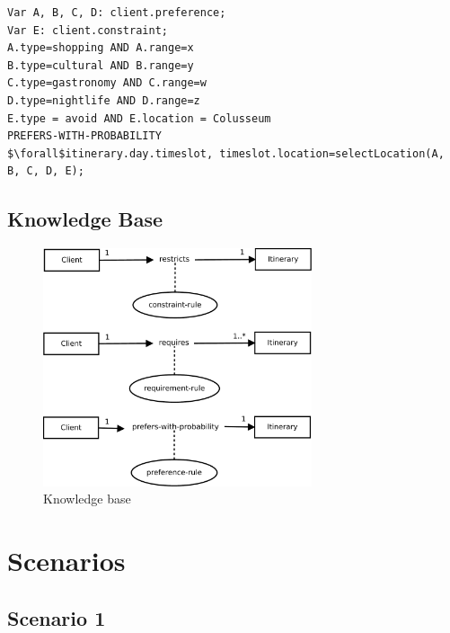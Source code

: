 \documentclass[11pt]{article} %
\begin{document}
\begin{lstlisting}[label=Rules,caption=The client expresses four preferences with four ranges (from 1 to 5). The method selectLocation will compose the itinerary selecting the locations that fits the preferences. For example it could select 3 shopping\, 1 gastronomy and 1 cultural locations.,breaklines=true,mathescape=true]
Var A, B, C, D: client.preference;
Var E: client.constraint;
A.type=shopping AND A.range=x
B.type=cultural AND B.range=y
C.type=gastronomy AND C.range=w
D.type=nightlife AND D.range=z
E.type = avoid AND E.location = Colusseum
PREFERS-WITH-PROBABILITY
$\forall$itinerary.day.timeslot, timeslot.location=selectLocation(A, B, C, D, E);
\end{lstlisting}

\subsection{Knowledge Base}

\begin{figure}[h]
\centering
\includegraphics[height=7cm]{images/knowledge_base.pdf}
\caption{Knowledge base}
\label{fig:knowledgebase}
\end{figure}



\section{Scenarios}


\subsection{Scenario 1}
\end{document}

